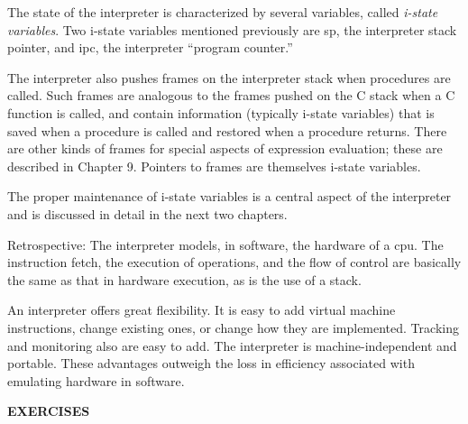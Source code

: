 The state of the interpreter is characterized by several variables,
called \textit{i-state variables}. Two i-state variables mentioned
previously are sp, the interpreter stack pointer, and ipc, the
interpreter ``program counter.''

The interpreter also pushes frames on the interpreter stack when
procedures are called. Such frames are analogous to the frames pushed
on the C stack when a C function is called, and contain information
(typically i-state variables) that is saved when a procedure is called
and restored when a procedure returns. There are other kinds of frames
for special aspects of expression evaluation; these are described in
Chapter 9. Pointers to frames are themselves i-state variables.

The proper maintenance of i-state variables is a central aspect of the
interpreter and is discussed in detail in the next two chapters.

Retrospective: The interpreter models, in software, the hardware of a
cpu. The instruction fetch, the execution of operations, and the flow
of control are basically the same as that in hardware execution, as is
the use of a stack.

An interpreter offers great flexibility. It is easy to add virtual
machine instructions, change existing ones, or change how they are
implemented. Tracking and monitoring also are easy to add. The
interpreter is machine-independent and portable. These advantages
outweigh the loss in efficiency associated with emulating hardware in
software.

\bigskip

\noindent\textbf{EXERCISES}

